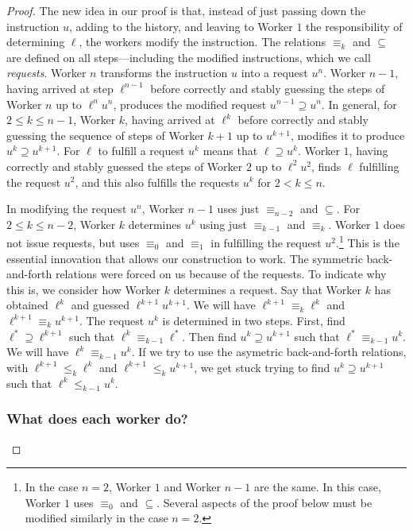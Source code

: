 \documentclass{article}
\theoremstyle{definition}
\begin{document}
\begin{proof}
		The new idea in our proof is that, instead of just passing down the instruction $u$, adding to the history, and leaving to Worker $1$ the responsibility of determining $\ell$, the workers modify the instruction.  The relations $\equiv_k$ and $\subseteq$ are defined on all steps---including the modified instructions, which we call \emph{requests}.  Worker $n$ transforms the instruction $u$ into a request $u^n$.  Worker $n-1$, having arrived at step $\ell^{n-1}$ before correctly and stably guessing the steps of Worker $n$ up to $\ell^nu^n$, produces the modified request $u^{n-1}\supseteq u^n$.  In general, for $2\leq k \leq n-1$, Worker $k$, having arrived at $\ell^k$ before correctly and stably guessing the sequence of steps of Worker $k+1$ up to $u^{k+1}$, modifies it to produce $u^k\supseteq u^{k+1}$. For $\ell$ to fulfill a request $u^k$ means that $\ell\supseteq u^k$.  Worker $1$, having correctly and stably guessed the steps of Worker $2$ up to $\ell^2u^2$, finds $\ell$ fulfilling the request $u^2$, and this also fulfills the requests $u^k$ for $2 < k\leq n$.    
		
In modifying the request $u^n$, Worker $n-1$ uses just $\equiv_{n-2}$ and $\subseteq$.  For $2 \leq k \leq n-2$, Worker $k$ determines $u^k$ using just $\equiv_{k-1}$ and $\equiv_k$.  Worker $1$ does not issue requests, but uses $\equiv_0$ and $\equiv_1$ in fulfilling the request $u^2$.\footnote{In the case $n=2$, Worker $1$ and Worker $n-1$ are the same. In this case, Worker $1$ uses $\equiv_0$ and $\subseteq$.  Several aspects of the proof below must be modified similarly in the case $n = 2$.}  This is the essential innovation that allows our construction to work.  The symmetric back-and-forth relations were forced on us because of the requests.  To indicate why this is, we consider how Worker $k$ determines a request.  Say that Worker $k$ has obtained $\ell^k$ and guessed $\ell^{k+1}u^{k+1}$.  We will have $\ell^{k+1}\equiv_k\ell^k$ and $\ell^{k+1}\equiv_k u^{k+1}$.  The request $u^k$ is determined in two steps.  First, find $\ell^*\supseteq \ell^{k+1}$ such that $\ell^k\equiv_{k-1} \ell^*$.  Then find $u^k\supseteq u^{k+1}$ such that $\ell^*\equiv_{k-1} u^k$.  We will have $\ell^k\equiv_{k-1} u^k$.  If we try to use the asymetric back-and-forth relations, with $\ell^{k+1}\leq_k\ell^k$ and $\ell^{k+1}\leq_k u^{k+1}$, we get stuck trying to find $u^k\supseteq u^{k+1}$ such that $\ell^k\leq_{k-1} u^k$. 
		
		\subsubsection{What does each worker do?}
		

\end{proof}
\end{document}
